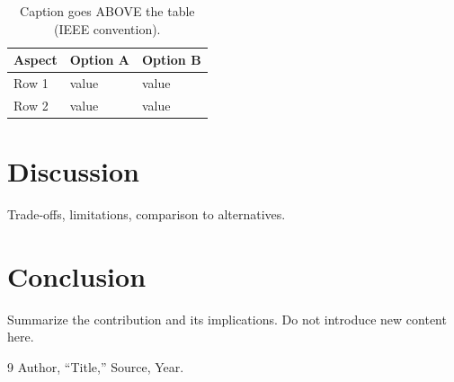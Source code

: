 \documentclass[10pt,twocolumn]{article}
\begin{document}
\begin{table}[htbp]
\centering
\small
\caption{Caption goes ABOVE the table (IEEE convention).}
\label{tab:example}
\begin{tabular}{p{1.6cm}p{2.3cm}p{2.2cm}}
\hline
\textbf{Aspect} & \textbf{Option A} & \textbf{Option B} \\
\hline
Row 1 & value & value \\
Row 2 & value & value \\
\hline
\end{tabular}
\end{table}

\section{Discussion}
Trade-offs, limitations, comparison to alternatives.

\section{Conclusion}
Summarize the contribution and its implications. Do not introduce new
content here.

\begin{thebibliography}{9}
\small
{} Author, ``Title,'' Source, Year.
\end{thebibliography}
\end{document}
